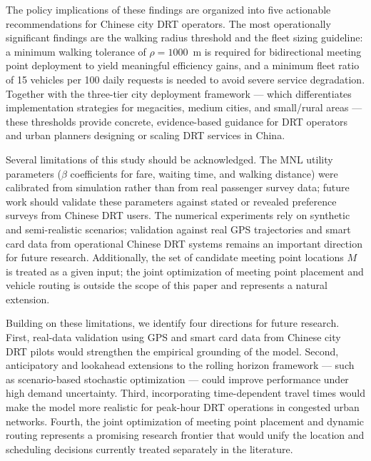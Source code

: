 The policy implications of these findings are organized into five actionable
recommendations for Chinese city DRT operators.
The most operationally significant findings are the walking radius threshold and the
fleet sizing guideline: a minimum walking tolerance of $\rho = 1000$~m is required for
bidirectional meeting point deployment to yield meaningful efficiency gains, and a
minimum fleet ratio of 15 vehicles per 100 daily requests is needed to avoid severe
service degradation.
Together with the three-tier city deployment framework — which differentiates
implementation strategies for megacities, medium cities, and small/rural areas — these
thresholds provide concrete, evidence-based guidance for DRT operators and urban
planners designing or scaling DRT services in China.

Several limitations of this study should be acknowledged.
The MNL utility parameters ($\beta$ coefficients for fare, waiting time, and walking
distance) were calibrated from simulation rather than from real passenger survey data;
future work should validate these parameters against stated or revealed preference surveys
from Chinese DRT users.
The numerical experiments rely on synthetic and semi-realistic scenarios; validation
against real GPS trajectories and smart card data from operational Chinese DRT systems
remains an important direction for future research.
Additionally, the set of candidate meeting point locations $M$ is treated as a given
input; the joint optimization of meeting point placement and vehicle routing is outside
the scope of this paper and represents a natural extension.

Building on these limitations, we identify four directions for future research.
First, real-data validation using GPS and smart card data from Chinese city DRT pilots
would strengthen the empirical grounding of the model.
Second, anticipatory and lookahead extensions to the rolling horizon framework — such as
scenario-based stochastic optimization \citep{bent2004} — could improve performance
under high demand uncertainty.
Third, incorporating time-dependent travel times would make the model more realistic for
peak-hour DRT operations in congested urban networks.
Fourth, the joint optimization of meeting point placement and dynamic routing represents
a promising research frontier that would unify the location and scheduling decisions
currently treated separately in the literature.
